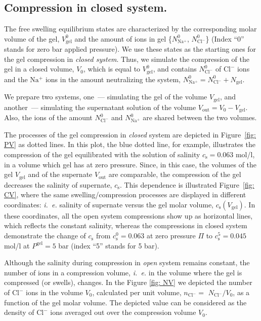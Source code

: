 \documentclass[journal,article,submit,pdftex,moreauthors]{Definitions/mdpi}
\newcommand{\ie}{\textit{i.~e.} }
\newcommand{\ncl}{n_\mathrm{Cl^-}}
\newcommand{\Nna}{N_\mathrm{Na^+}}
\newcommand{\Ncl}{N_\mathrm{Cl^-}}
\newcommand{\gel}{^\mathrm{gel}}
\newcommand{\cl}{\mathrm{Cl^-}}
\newcommand{\na}{\mathrm{Na^+}}
\newcommand{\cs}{c_{\mathrm{s}}}
\newcommand{\Vgel}{V_\mathrm{gel}}
\newcommand{\Ngel}{N_\mathrm{gel}}
\newcommand{\Pgel}{\Pi}
\newcommand{\Vout}{V_\mathrm{out}}
\newcommand{\Vbox}{V_0}
\newcommand{\reffig}[1]{Figure~\ref{#1}}
\begin{document}
\subsection{Compression in closed system.}
The free swelling equilibrium states are characterized by the corresponding molar volume of the gel, $\Vgel^0$ and the amount of ions in gel \{$\Nna^0$, $\Ncl^0$\} 
(Index ``0'' stands for zero bar applied pressure).
We use these states as the starting ones for the gel compression in \emph{closed system}. 
Thus, we simulate the compression of the gel in a closed volume, $\Vbox$, which is equal to $\Vgel^0$, and contains $\Ncl^0$ of $\cl$ ions and the $\na$ ions in the amount neutralizing the system, $\Nna^0 = $$\Ncl^0 + \Ngel$.

We prepare two systems, one~--- simulating the gel of the volume $\Vgel$, and another~--- simulating the supernatant solution of the volume $\Vout = \Vbox - \Vgel$.
Also, the ions of the amount $\Ncl^0$ and $\Nna^0$ are shared between the two volumes. 

The processes of the gel compression in \emph{closed} system are depicted in Figure~\ref{fig: PV} as dotted lines.
In this plot, the blue dotted line, for example, illustrates the compression of the gel equilibrated with the solution of salinity $\cs=0.063$ mol/l, in a volume which gel has at zero pressure. 
Since, in this case, the volumes of the gel $\Vgel$ and of the supernate $\Vout$ are comparable, the compression of the gel decreases the salinity of supernate, $\cs$. 
This dependence is illustrated \reffig{fig: CV}, where the same swelling/compression processes are displayed in different coordinates: \ie salinity of supernate versus the gel molar volume, $\cs(\Vgel)$.
In these coordinates, all the open system compressions show up as horizontal lines, which reflects the constant salinity, whereas the compressions in closed system demonstrate the change of $\cs$ from $\cs^{0}=0.063$ at zero pressure $\Pgel$ to $\cs^{5}=0.045$ mol/l at $P\gel=5$ bar (index ``5'' stands for 5 bar). 

Although the salinity during compression in \emph{open} system remains constant, the number of ions in a compression volume, \ie in the volume where the gel is compressed (or swells), changes.
In the Figure \ref{fig: NV} we depicted the number of $\cl$ ions in the volume $\Vbox$, calculated per unit volume, $\ncl =$ $\Ncl/\Vbox$, as a function of the gel molar volume. 
The depicted value can be considered as the density of $\cl$ ions averaged out over the compression volume $\Vbox$. 
\end{document}
